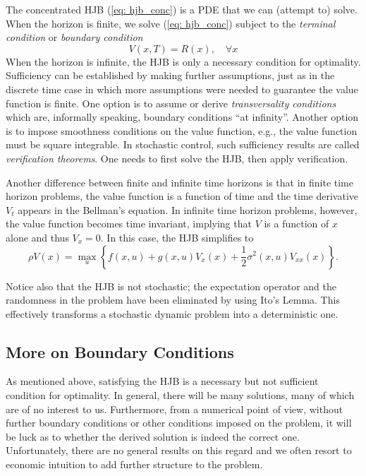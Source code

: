 \documentclass[\topdir/lecture\_notes.tex]{subfiles}
\begin{document}
The concentrated HJB (\ref{eq: hjb_conc}) is a PDE that we can (attempt to) solve. When the horizon is finite, we solve (\ref{eq: hjb_conc}) subject to the \emph{terminal condition} or \emph{boundary condition}
\begin{equation*}
    V(x,T) = R(x), \quad \forall x
\end{equation*}
When the horizon is infinite, the HJB is only a necessary condition for optimality. Sufficiency can be established by making further assumptions, just as in the discrete time case in which more assumptions were needed to guarantee the value function is finite. One option is to assume or derive \emph{transversality conditions} which are, informally speaking, boundary conditions ``at infinity''. Another option is to impose smoothness conditions on the value function, e.g., the value function must be square integrable. In stochastic control, such sufficiency results are called \emph{verification theorems}. One needs to first solve the HJB, then apply verification.

Another difference between finite and infinite time horizons is that in finite time horizon problems, the value function is a function of time and the time derivative $V_{t}$ appears in the Bellman's equation. In infinite time horizon problems, however, the value function becomes time invariant, implying that $V$ is a function of $x$ alone and thus $V_{x}=0$. In this case, the HJB simplifies to
\begin{equation*}
\rho V(x)=\max_{u}\left\{ f(x,u)+g(x,u)V_{x}(x)+\frac{1}{2}\sigma^{2}(x,u)V_{xx}(x)\right\}.
\end{equation*}

Notice also that the HJB is not stochastic; the expectation operator and the randomness in the problem have been eliminated by using Ito's Lemma. This effectively transforms a stochastic dynamic problem into a deterministic one.

\subsection{More on Boundary Conditions}
As mentioned above, satisfying the HJB is a necessary but not sufficient condition for optimality. In general, there will be many solutions, many of which are of no interest to us. Furthermore, from a numerical point of view, without further boundary conditions or other conditions imposed on the problem, it will be luck as to whether the derived solution is indeed the correct one. Unfortunately, there are no general results on this regard and we often resort to economic intuition to add further structure to the problem.
\end{document}
